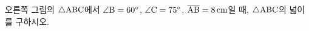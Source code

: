 \noindent\begin{minipage}[t]{0.58\linewidth}\vspace{0pt}\raggedright 오른쪽 그림의 $\triangle\mathrm{ABC}$에서 $\angle\mathrm{B}=60^\circ$, $\angle\mathrm{C}=75^\circ$, $\overline{\mathrm{AB}}=8\,\mathrm{cm}$일 때, $\triangle\mathrm{ABC}$의 넓이를 구하시오.\end{minipage}\hfill\begin{minipage}[t]{0.4\linewidth}\vspace{0pt}\centering \resizebox{\ifdim\width>\linewidth\linewidth\else\width\fi}{!}{}\end{minipage}\par
